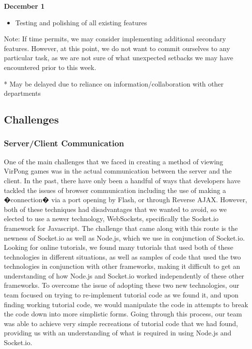 \begin{description}
				\item \textbf{December 1}
				\begin{itemize}
					\item Testing and polishing of all existing features
				\end{itemize}
				Note: If time permits, we may consider implementing additional secondary features. However, at this point, we do not want to commit ourselves to any particular task, as we are not sure of what unexpected setbacks we may have encountered prior to this week.
			\end{description}
			
			* May be delayed due to reliance on information/collaboration with other departments









		\subsection{Challenges}
			\subsubsection{Server/Client Communication}

One of the main challenges that we faced in creating a method of viewing VirPong games was in the actual communication between the server and the client. In the past, there have only been a handful of ways that developers have tackled the issues of browser communication including the use of making a �connection� via a port opening by Flash, or through Reverse AJAX. However, both of these techniques had disadvantages that we wanted to avoid, so we elected to use a newer technology, WebSockets, specifically the Socket.io framework for Javascript. The challenge that came along with this route is the newness of Socket.io as well as Node.js, which we use in conjunction of Socket.io. Looking for online tutorials, we found many tutorials that used both of these technologies in different situations, as well as samples of code that used the two technologies in conjunction with other frameworks, making it difficult to get an understanding of how Node.js and Socket.io worked independently of these other frameworks. To overcome the issue of adopting these two new technologies, our team focused on trying to re-implement tutorial code as we found it, and upon finding working tutorial code, we would manipulate the code in attempts to break the code down into more simplistic forms. Going through this process, our team was able to achieve very simple recreations of tutorial code that we had found, providing us with an understanding of what is required in using Node.js and Socket.io.

